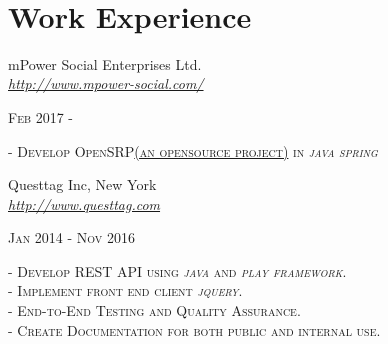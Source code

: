 \documentclass[10pt]{article} %
\begin{document}
\color{text1} %


\par{\\ %



\begin{minipage}[t]{0.5\textwidth} %
\vspace{0pt} %
	

\section{Work Experience} 

{{\raggedright\large mPower Social Enterprises Ltd. \\
\textit{\href {http://www.mpower-social.com/}{http://www.mpower-social.com/}}\\
}\raggedleft\textsc{Feb 2017 - }\\[1pt]}
	\textsc{- Develop OpenSRP\href {http://smartregister.org/}{(an opensource project)} in \textit{java} \textit{spring}}\\


{{\raggedright\large Questtag Inc, New York  \\
\textit{\href {http://www.questtag.com}{http://www.questtag.com}}\\
}\raggedleft\textsc{Jan 2014 - Nov 2016}\\[1pt]}
	 \textsc{- Develop REST API using \textit{java} and \textit{play framework}.}\\
	 \textsc{- Implement front end client \textit{jquery}.}\\
	 \textsc{- End-to-End Testing and Quality Assurance.}\\
	 \textsc{- Create Documentation for both public and internal use.}\\
	




\end{minipage}}
\end{document}
